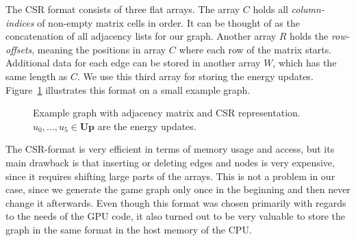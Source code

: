The CSR format consists of three flat arrays.
The array $C$ holds all \emph{column-indices} of non-empty matrix cells in order.
It can be thought of as the concatenation of all adjacency lists for our graph.
Another array $R$ holds the \emph{row-offsets}, meaning the positions in array
$C$ where each row of the matrix starts.
Additional data for each edge can be stored in another array $W$, which has the
same length as $C$.
We use this third array for storing the energy updates.
Figure~\ref{fig:csr} illustrates this format on a small example graph.

\begin{figure}[ht]
\begin{center}
\end{center}
\caption{Example graph with adjacency matrix and CSR representation.
    $u_0, \ldots, u_5 \in \mathbf{Up}$ are the energy updates.
}%
\label{fig:csr}
\end{figure}

The CSR-format is very efficient in terms of memory usage and access,
but its main drawback is that inserting or deleting edges and nodes is very
expensive, since it requires shifting large parts of the arrays.
This is not a problem in our case, since we generate the game graph only once
in the beginning and then never change it afterwards.
Even though this format was chosen primarily with regards to the needs
of the GPU code, it also turned out to be very valuable to store the graph in
the same format in the host memory of the CPU.\@


